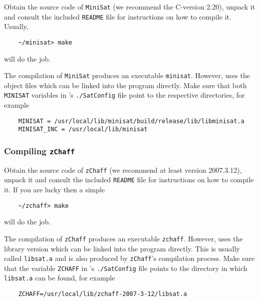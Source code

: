 Obtain the source code of \texttt{MiniSat} (we recommend the C-version 2.20),
unpack it and consult the included \texttt{README} file for instructions on how to compile it. Usually,
\begin{verbatim}
    ~/minisat> make
\end{verbatim}
will do the job.

The compilation of \texttt{MiniSat} produces an executable \texttt{minisat}. However, \pgsolver uses the
object files which can be linked into the program directly. Make sure that both
\verb#MINISAT# variables in \pgsolver's \texttt{./SatConfig} file point to the
respective directories, for example
\begin{verbatim}
    MINISAT = /usr/local/lib/minisat/build/release/lib/libminisat.a
    MINISAT_INC = /usr/local/lib/minisat
\end{verbatim}


\subsubsection{Compiling \texttt{zChaff}}

Obtain the source code of \texttt{zChaff} (we recommend at least version 2007.3.12), unpack it and
consult the included \texttt{README} file for instructions on how to compile it. If you are lucky
then a simple
\begin{verbatim}
    ~/zchaff> make
\end{verbatim}
will do the job.


The compilation of \texttt{zChaff} produces an executable \texttt{zchaff}. However, \pgsolver uses the
library version which can be linked into the program directly. This is usually called \texttt{libsat.a}
and is also produced by \texttt{zChaff}'s compilation process. Make sure that the variable
\verb#ZCHAFF# in \pgsolver's \texttt{./SatConfig} file points to the
directory in which \texttt{libsat.a} can be found, for example
\begin{verbatim}
    ZCHAFF=/usr/local/lib/zchaff-2007-3-12/libsat.a
\end{verbatim}



